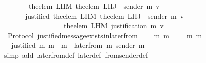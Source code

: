 \begin{isabellebody}
\ \ \ \ \ \ \ {\isacharequal}\ the{\isacharunderscore}elem\ {\isacharparenleft}L{\isacharunderscore}H{\isacharunderscore}M\ {\isacharparenleft}the{\isacharunderscore}elem\ {\isacharparenleft}L{\isacharunderscore}H{\isacharunderscore}J\ {\isasymsigma}\ {\isacharparenleft}sender\ m{\isacharprime}{\isacharparenright}{\isacharparenright}{\isacharparenright}\ v{\isacharparenright}\isanewline
\ \ \ \ \ \ {\isasymor}\ justified\ {\isacharparenleft}the{\isacharunderscore}elem\ {\isacharparenleft}L{\isacharunderscore}H{\isacharunderscore}M\ {\isacharparenleft}the{\isacharunderscore}elem\ {\isacharparenleft}L{\isacharunderscore}H{\isacharunderscore}J\ {\isasymsigma}\ {\isacharparenleft}sender\ m{\isacharprime}{\isacharparenright}{\isacharparenright}{\isacharparenright}\ v{\isacharparenright}{\isacharparenright}\ \isanewline
\ \ \ \ \ \ \ \ \ \ \ \ \ \ \ \ \ \ {\isacharparenleft}the{\isacharunderscore}elem\ {\isacharparenleft}L{\isacharunderscore}H{\isacharunderscore}M\ {\isacharparenleft}justification\ m{\isacharprime}{\isacharparenright}\ v{\isacharparenright}{\isacharparenright}{\isachardoublequoteclose}\isanewline
%
\isadelimproof
\ \ %
\endisadelimproof
%
\isatagproof
{}\isamarkupfalse%
%
\endisatagproof
{\isafoldproof}%
%
\isadelimproof
\isanewline
%
\endisadelimproof
\isanewline
\isanewline
{}\isamarkupfalse%
\ {\isacharparenleft}\ Protocol{\isacharparenright}\ justified{\isacharunderscore}message{\isacharunderscore}exists{\isacharunderscore}in{\isacharunderscore}later{\isacharunderscore}from{\isacharcolon}\isanewline
\ \ {\isachardoublequoteopen}{\isasymforall}\ {\isasymsigma}\ m{}\ m{}{\isachardot}\ {\isasymsigma}\ {\isasymin}\ {\isasymSigma}\ {\isasymand}\ {\isacharbraceleft}m{}{\isacharcomma}\ m{}{\isacharbraceright}\ {\isasymsubseteq}\ {\isasymsigma}\isanewline
\ \ {\isasymlongrightarrow}\ justified\ m{}\ m{}\ {\isasymlongrightarrow}\ m{}\ {\isasymin}\ later{\isacharunderscore}from\ {\isacharparenleft}m{}{\isacharcomma}\ sender\ m{}{\isacharcomma}\ {\isasymsigma}{\isacharparenright}{\isachardoublequoteclose}\isanewline
%
\isadelimproof
\ \ %
\endisadelimproof
%
\isatagproof
{}\isamarkupfalse%
\ {\isacharparenleft}simp\ add{\isacharcolon}\ later{\isacharunderscore}from{\isacharunderscore}def\ later{\isacharunderscore}def\ from{\isacharunderscore}sender{\isacharunderscore}def{\isacharparenright}\isanewline
\ \ \isamarkupfalse%
%
\endisatagproof
{\isafoldproof}%
%
\isadelimproof

\end{isabellebody}
